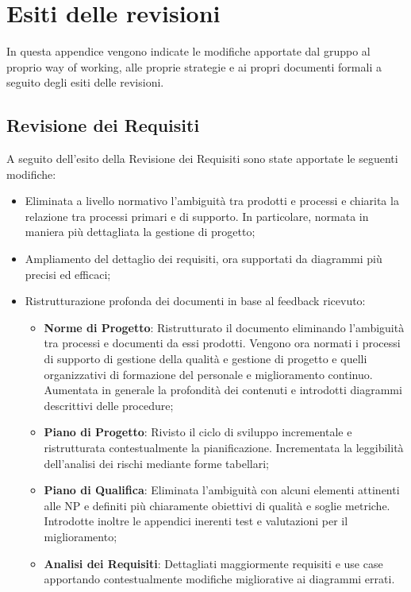 \documentclass[openany,12pt,a4paper]{report}
\begin{document}
\chapter{Esiti delle revisioni}

In questa appendice vengono indicate le modifiche apportate dal gruppo al proprio way of working, alle proprie strategie e ai propri documenti formali a seguito degli esiti delle revisioni.

\section{Revisione dei Requisiti}

A seguito dell'esito della Revisione dei Requisiti sono state apportate le seguenti modifiche:

\begin{itemize}
	\item Eliminata a livello normativo l’ambiguità tra prodotti e processi e chiarita la relazione tra processi primari e di supporto. In particolare, normata in maniera più dettagliata la gestione di progetto;
	\item Ampliamento del dettaglio dei requisiti, ora supportati da diagrammi più precisi ed efficaci;
	\item Ristrutturazione profonda dei documenti in base al feedback ricevuto:
	\begin{itemize}
		\item \textbf{Norme di Progetto}: Ristrutturato il documento eliminando l'ambiguità tra processi e documenti da essi prodotti. Vengono ora normati i processi di supporto di gestione della qualità e gestione di progetto e quelli organizzativi di formazione del personale e miglioramento continuo. Aumentata in generale la profondità dei contenuti e introdotti diagrammi descrittivi delle procedure;
		\item \textbf{Piano di Progetto}: Rivisto il ciclo di sviluppo incrementale e ristrutturata contestualmente la pianificazione. Incrementata la leggibilità dell'analisi dei rischi mediante forme tabellari;
		\item \textbf{Piano di Qualifica}: Eliminata l'ambiguità con alcuni elementi attinenti alle NP e definiti più chiaramente obiettivi di qualità e soglie metriche. Introdotte inoltre le appendici inerenti test e valutazioni per il miglioramento;
		\item \textbf{Analisi dei Requisiti}: Dettagliati maggiormente requisiti e use case apportando contestualmente modifiche migliorative ai diagrammi errati.
	\end{itemize}
\end{itemize}
\end{document}
